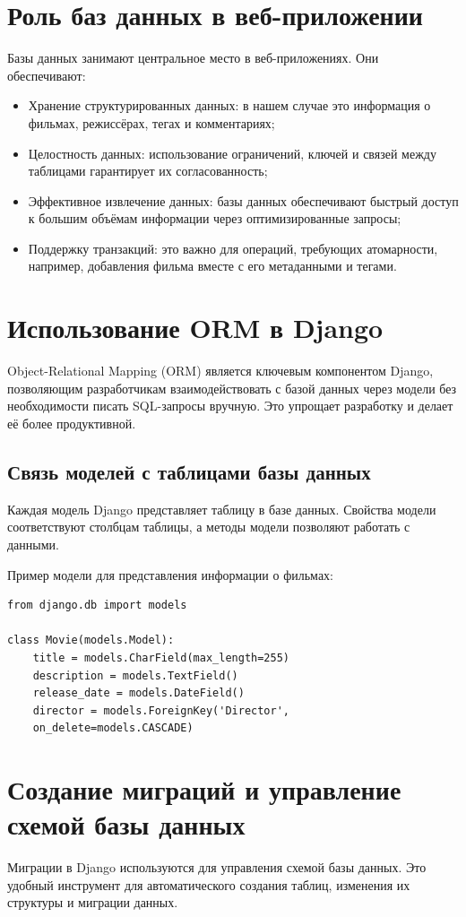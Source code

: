 \section{Роль баз данных в веб-приложении}
Базы данных занимают центральное место в веб-приложениях. Они обеспечивают:
\begin{itemize}
    \item Хранение структурированных данных: в нашем случае это информация о фильмах, режиссёрах, тегах и комментариях;
    \item Целостность данных: использование ограничений, ключей и связей между таблицами гарантирует их согласованность;
    \item Эффективное извлечение данных: базы данных обеспечивают быстрый доступ к большим объёмам информации через оптимизированные запросы;
    \item Поддержку транзакций: это важно для операций, требующих атомарности, например, добавления фильма вместе с его метаданными и тегами.
\end{itemize}

\section{Использование ORM в Django}
Object-Relational Mapping (ORM) является ключевым компонентом Django, позволяющим разработчикам взаимодействовать с базой данных через модели без необходимости писать SQL-запросы вручную. Это упрощает разработку и делает её более продуктивной.

\subsection*{Связь моделей с таблицами базы данных}
Каждая модель Django представляет таблицу в базе данных. Свойства модели соответствуют столбцам таблицы, а методы модели позволяют работать с данными.

Пример модели для представления информации о фильмах:
\begin{verbatim}
from django.db import models

class Movie(models.Model):
    title = models.CharField(max_length=255)
    description = models.TextField()
    release_date = models.DateField()
    director = models.ForeignKey('Director', 
    on_delete=models.CASCADE)
\end{verbatim}

\section{Создание миграций и управление схемой базы данных}
Миграции в Django используются для управления схемой базы данных. Это удобный инструмент для автоматического создания таблиц, изменения их структуры и миграции данных.

